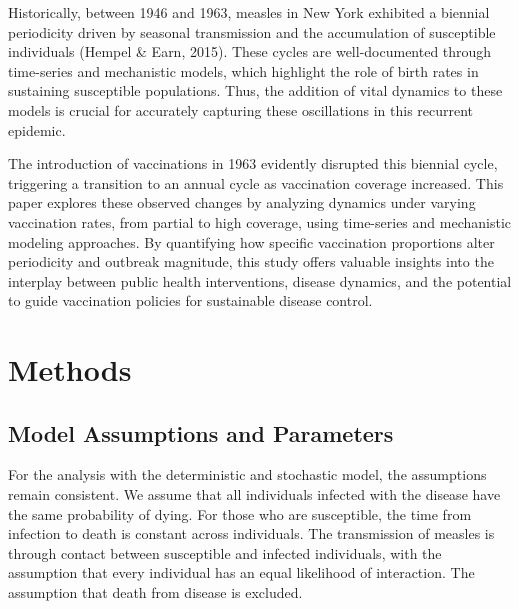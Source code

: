 \documentclass[12pt]{article}
\begin{document}
\indent Historically, between 1946 and 1963, measles in New York exhibited a biennial periodicity driven by seasonal transmission and the accumulation of susceptible individuals (Hempel \& Earn, 2015). These cycles are well-documented through time-series and mechanistic models, which highlight the role of birth rates in sustaining susceptible populations. Thus, the addition of vital dynamics to these models is crucial for accurately capturing these oscillations in this recurrent epidemic.

\indent The introduction of vaccinations in 1963 evidently disrupted this biennial cycle, triggering a transition to an annual cycle as vaccination coverage increased. This paper explores these observed changes by analyzing dynamics under varying vaccination rates, from partial to high coverage, using time-series and mechanistic modeling approaches. By quantifying how specific vaccination proportions alter periodicity and outbreak magnitude, this study offers valuable insights into the interplay between public health interventions, disease dynamics, and the potential to guide vaccination policies for sustainable disease control.


\section{Methods}

\subsection {Model Assumptions and Parameters}
For the analysis with the deterministic and stochastic model, the assumptions remain consistent. We assume that all individuals infected with the disease have the same probability of dying. For those who are susceptible, the time from infection to death is constant across individuals. The transmission of measles is through contact between susceptible and infected individuals, with the assumption that every individual has an equal likelihood of interaction. The assumption that death from disease is excluded.
\end{document}

